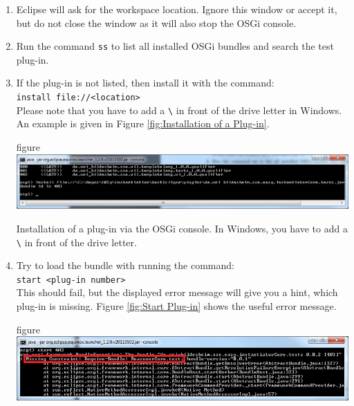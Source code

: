 \begin{description}
\begin{enumerate}
\begin{nofloat}{figure}
\begin{center}
				\end{center}
				\fi
				\centering
				\caption[Opening the OSGi console]{Command for opening the OSGi console. This must be done inside the \textit{plug-in}'s folder of the Eclipse instance for testing after running the build script.}
				\label{fig:Opening the OSGi console}
			\end{nofloat}
		\item Eclipse will ask for the workspace location. Ignore this window or accept it, but do not close the window as it will also stop the OSGi console.
		\item Run the command \texttt{ss} to list all installed OSGi bundles and search the test plug-in.
		\item If the plug-in is not listed, then install it with the command:\\
			\texttt{install file://<location>}\\
			Please note that you have to add a \texttt{\textbackslash} in front of the drive letter in Windows. An example is given in Figure \vref{fig:Installation of a Plug-in}.
			\begin{nofloat}{figure}
				\ifpdf	
				\hspace{-1.85cm}\includegraphics[width=\textwidth]{pictures/faq/installPlug-in}
				\fi
				\centering
				\caption[Installation of a plug-in]{Installation of a plug-in via the OSGi console. In Windows, you have to add a  \texttt{\textbackslash} in front of the drive letter.}
				\label{fig:Installation of a Plug-in}
			\end{nofloat}
		\item Try to load the bundle with running the command:\\
			\texttt{start <plug-in number>}\\
			This should fail, but the displayed error message will give you a hint, which plug-in is missing. Figure \vref{fig:Start Plug-in} shows the useful error message.
			\begin{nofloat}{figure}
				\ifpdf	
				\hspace{-1.85cm}\includegraphics[width=\textwidth]{pictures/faq/startPlug-in}

\end{nofloat}
\end{enumerate}
\end{description}
